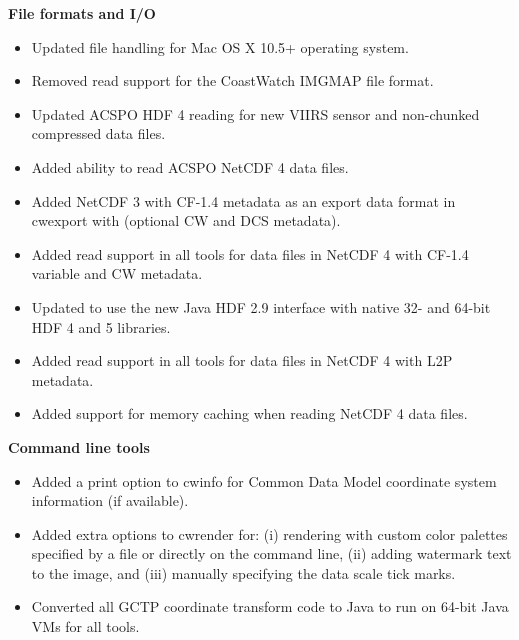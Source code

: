 \hspace{0.4cm} {\bf File formats and I/O}

\begin{itemize}

  \item Updated file handling for Mac OS X 10.5+ operating system.

  \item Removed read support for the CoastWatch IMGMAP file format.

  \item Updated ACSPO HDF 4 reading for new VIIRS sensor and non-chunked
  compressed data files.

  \item Added ability to read ACSPO NetCDF 4 data files.

  \item Added NetCDF 3 with CF-1.4 metadata as an export data format in
  cwexport with (optional CW and DCS metadata).

  \item Added read support in all tools for data files in NetCDF 4 with CF-1.4
  variable and CW metadata.

  \item Updated to use the new Java HDF 2.9 interface with native 32- and
  64-bit HDF 4 and 5 libraries.

  \item Added read support in all tools for data files in NetCDF 4 with L2P
  metadata.

  \item Added support for memory caching when reading NetCDF 4 data files.

\end{itemize}

\hspace{0.4cm} {\bf Command line tools}

\begin{itemize}

  \item Added a print option to cwinfo for Common Data Model coordinate
  system information (if available).

  \item Added extra options to cwrender for: (i) rendering with custom color
  palettes specified by a file or directly on the command line, (ii) adding
  watermark text to the image, and (iii) manually specifying the data scale
  tick marks.

  \item Converted all GCTP coordinate transform code to Java to run on 64-bit
  Java VMs for all tools.

\end{itemize}

